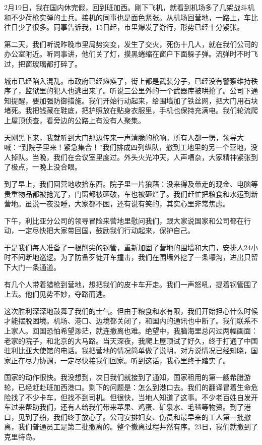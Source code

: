 \documentclass[12pt,UTF-8,openany]{ctexbook}
\begin{document}
\begin{large}
    
    2月19日，我在国内休完假，回到班加西。刚下飞机，就看到机场多了几架战斗机和不少荷枪实弹的士兵。接机的同事也是面色紧张。从机场回营地，一路上，车比往日少了很多。同事告诉我，15日起，市里爆发了游行，形势已经十分紧张。
    
    第二天，我们听说昨晚市里局势突变，发生了交火，死伤十几人，就在我们公司的办公室附近。听同事讲，他们关了灯，摸黑蜷缩在窗户下面躲子弹。流弹时不时飞过，把窗玻璃都打碎了。
    
    城市已经陷入混乱。市政府已经瘫痪了，街上都是武装分子，已经没有警察维持秩序了，监狱里的犯人也逃出来了。听说三公里外的一个武器库被哄抢了。公司下通知提醒，要加强防御措施。我们开始行动起来，给围墙加了铁丝网，把大门用石块堵死。我把钱藏在鞋底，把护照放在贴身衣服里，手机也保持充满电。我们轮流爬上屋顶侦查，看旁边的公路上有没有人聚集。
    
    天刚黑下来，我就听到大门那边传来一声清脆的枪响。所有人都一愣，领导大喊：“到院子里来！紧急集合！”我们排成四列纵队，撤到工地里的另一个营地，没人掉队。当晚，我们在会议室里度过。外头火光冲天，人声嘈杂，大家精神紧张到了极点，一晚上没合眼。
    
    到了早上，我们回营地收拾东西。院子里一片狼藉：没来得及带走的现金、电脑等贵重物品都被抢光了，门窗都被砸破，车也被砸烂了。我们赶忙把粮食和水运到新营地。虽说一夜没睡，大家都不困，还有说有笑的，其实心里非常焦虑。
    
    下午，利比亚分公司的领导冒险来营地里慰问我们，跟大家说国家和公司都在行动，一定尽快把大家带回国，鼓励我们行动起来，保护自己。
    
    于是我们每人准备了一根削尖的钢管，重新加固了营地的围墙和大门，安排人24小时不间断地巡逻。为了防备歹徒开车撞击，我们在围墙外挖了一条壕沟，进出只留下大门一条通道。
    
    有几个人带着猎枪到营地，想把我们的皮卡车开走。我们一声怒吼，提着钢管围了上去。他们见势不妙，夺路而逃。
    
    这次胜利深深地鼓舞了我们的士气。但由于粮食和水有限，我们开始担心什么时候才能摆脱困境。机场、港口、边境都关闭了，和国内的通讯也中断了。我们联系不上家人。回国恐怕希望渺茫，就连撤离也难。绝望中，我脑海里总闪过两幅画面：老家的院子，和北京的大马路。当天深夜，我爬上屋顶试了好久，终于打通了中国驻利比亚大使馆的电话。我把营地的情况简单做了说明，对方说情况已经知晓，国家正在尽力协调，一定尽快接我们回家。听到这话，我心里终于踏实了。
    
    国家的动作很快。我没想到，次日我们就接到了通知，国家租用的第一艘希腊游轮，已经赶赴班加西港口。剩下的问题是：怎么到港口去。我们的翻译冒着生命危险找了不少卡车，但找不到司机。但很快，当地人知道了这事。不少老百姓自发开车过来帮助我们，还有人给我们带来苹果、鸡蛋、矿泉水、毛毯等物资。到了港口，见到了船，我们终于放心了。公司安排妇女、伤员和最早来的工人第一批撤离，我们普通员工是第二批撤离的。整个撤离过程井然有序。23日，我们就撤到了克里特岛。
    

\end{large}
\end{document}
